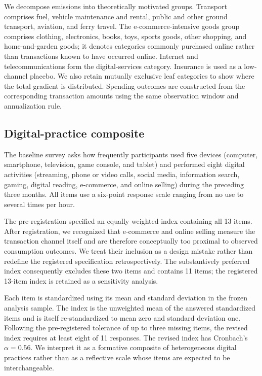 \documentclass[11pt,a4paper]{article}
\begin{document}
We decompose emissions into theoretically motivated groups. Transport comprises fuel, vehicle maintenance and rental, public and
other ground transport, aviation, and ferry travel. The e-commerce-intensive
goods group comprises clothing, electronics, books, toys, sports goods, other
shopping, and home-and-garden goods; it denotes categories commonly purchased
online rather than transactions known to have occurred online. Internet and
telecommunications form the digital-services category. Insurance is used as a
low-channel placebo. We also retain mutually exclusive leaf categories to show
where the total gradient is distributed. Spending outcomes are constructed from
the corresponding transaction amounts using the same observation window and
annualization rule.

\subsection{Digital-practice composite}
The baseline survey asks how frequently participants used five devices
(computer, smartphone, television, game console, and tablet) and performed
eight digital activities (streaming, phone or video calls, social media,
information search, gaming, digital reading, e-commerce, and online selling)
during the preceding three months. All items use a six-point response scale
ranging from no use to several times per hour.

The pre-registration specified an equally weighted index containing all 13
items. After registration, we recognized that e-commerce and online selling
measure the transaction channel itself and are therefore conceptually too proximal
to observed consumption outcomes. We treat their inclusion as a
design mistake rather than redefine the registered specification
retrospectively. The substantively preferred index consequently excludes these two items and contains 11 items; the registered 13-item index is retained as a sensitivity analysis.

Each item is standardized using its mean and standard deviation in the frozen
analysis sample. The index is the unweighted mean of the answered standardized items and is itself re-standardized to mean zero and standard deviation one. Following the pre-registered tolerance of up to three missing items, the revised index requires at least eight of 11 responses. The revised index has Cronbach's $\alpha=0.56$. We interpret it as a formative composite of heterogeneous digital practices rather than as a reflective scale whose items are expected to be interchangeable.
\end{document}
